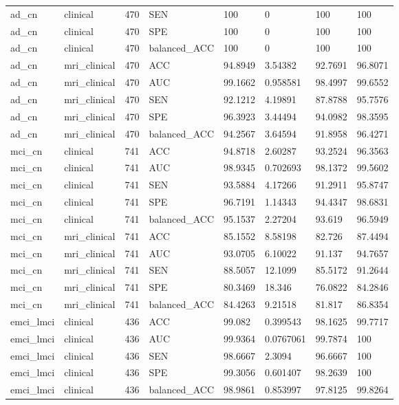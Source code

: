 \begin{landscape}
\begin{longtable}{llllllll}
ad\_cn & clinical & 470 & SEN & 100 & 0 & 100 & 100 \\
ad\_cn & clinical & 470 & SPE & 100 & 0 & 100 & 100 \\
ad\_cn & clinical & 470 & balanced\_ACC & 100 & 0 & 100 & 100 \\
ad\_cn & mri\_clinical & 470 & ACC & 94.8949 & 3.54382 & 92.7691 & 96.8071 \\
ad\_cn & mri\_clinical & 470 & AUC & 99.1662 & 0.958581 & 98.4997 & 99.6552 \\
ad\_cn & mri\_clinical & 470 & SEN & 92.1212 & 4.19891 & 87.8788 & 95.7576 \\
ad\_cn & mri\_clinical & 470 & SPE & 96.3923 & 3.44494 & 94.0982 & 98.3595 \\
ad\_cn & mri\_clinical & 470 & balanced\_ACC & 94.2567 & 3.64594 & 91.8958 & 96.4271 \\
mci\_cn & clinical & 741 & ACC & 94.8718 & 2.60287 & 93.2524 & 96.3563 \\
mci\_cn & clinical & 741 & AUC & 98.9345 & 0.702693 & 98.1372 & 99.5602 \\
mci\_cn & clinical & 741 & SEN & 93.5884 & 4.17266 & 91.2911 & 95.8747 \\
mci\_cn & clinical & 741 & SPE & 96.7191 & 1.14343 & 94.4347 & 98.6831 \\
mci\_cn & clinical & 741 & balanced\_ACC & 95.1537 & 2.27204 & 93.619 & 96.5949 \\
mci\_cn & mri\_clinical & 741 & ACC & 85.1552 & 8.58198 & 82.726 & 87.4494 \\
mci\_cn & mri\_clinical & 741 & AUC & 93.0705 & 6.10022 & 91.137 & 94.7657 \\
mci\_cn & mri\_clinical & 741 & SEN & 88.5057 & 12.1099 & 85.5172 & 91.2644 \\
mci\_cn & mri\_clinical & 741 & SPE & 80.3469 & 18.346 & 76.0822 & 84.2846 \\
mci\_cn & mri\_clinical & 741 & balanced\_ACC & 84.4263 & 9.21518 & 81.817 & 86.8354 \\
emci\_lmci & clinical & 436 & ACC & 99.082 & 0.399543 & 98.1625 & 99.7717 \\
emci\_lmci & clinical & 436 & AUC & 99.9364 & 0.0767061 & 99.7874 & 100 \\
emci\_lmci & clinical & 436 & SEN & 98.6667 & 2.3094 & 96.6667 & 100 \\
emci\_lmci & clinical & 436 & SPE & 99.3056 & 0.601407 & 98.2639 & 100 \\
emci\_lmci & clinical & 436 & balanced\_ACC & 98.9861 & 0.853997 & 97.8125 & 99.8264 \\

\end{longtable}
\end{landscape}
